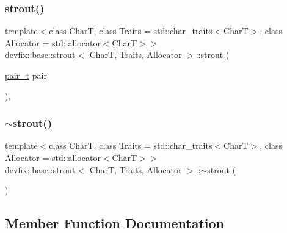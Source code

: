 \subsubsection{\texorpdfstring{strout()}{strout()}\hspace{0.1cm}{\footnotesize\ttfamily [3/3]}}
{\footnotesize\ttfamily template$<$class CharT, class Traits = std\+::char\+\_\+traits$<$\+Char\+T$>$, class Allocator = std\+::allocator$<$\+Char\+T$>$$>$ \\
\hyperlink{structdevfix_1_1base_1_1strout}{devfix\+::base\+::strout}$<$ CharT, Traits, Allocator $>$\+::\hyperlink{structdevfix_1_1base_1_1strout}{strout} (\begin{DoxyParamCaption}\item[{\hyperlink{structdevfix_1_1base_1_1strout_a2212cb8a99abec10490e891cc67820bb}{pair\+\_\+t}}]{pair }\end{DoxyParamCaption})\hspace{0.3cm}{\ttfamily [inline]}, {\ttfamily [explicit]}}

\mbox{\label{structdevfix_1_1base_1_1strout_aeffa562814f23e6e74f5d8404d673ea7}} 
\subsubsection{\texorpdfstring{$\sim$strout()}{~strout()}}
{\footnotesize\ttfamily template$<$class CharT, class Traits = std\+::char\+\_\+traits$<$\+Char\+T$>$, class Allocator = std\+::allocator$<$\+Char\+T$>$$>$ \\
\hyperlink{structdevfix_1_1base_1_1strout}{devfix\+::base\+::strout}$<$ CharT, Traits, Allocator $>$\+::$\sim$\hyperlink{structdevfix_1_1base_1_1strout}{strout} (\begin{DoxyParamCaption}{ }\end{DoxyParamCaption})\hspace{0.3cm}{\ttfamily [inline]}}



\subsection{Member Function Documentation}
\mbox{\label{structdevfix_1_1base_1_1strout_afb40810ea1e7384f08e1f837e34ff1c2}} 
